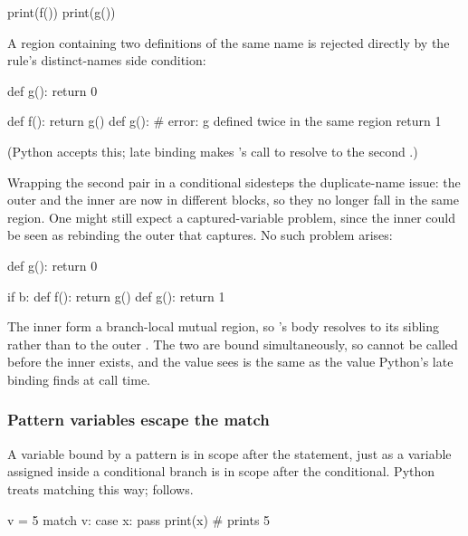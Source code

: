 \begin{PaperOnly}
\begin{python}
print(f())
print(g())
\end{python}

A region containing two definitions of the same name is rejected directly by the 
rule's distinct-names side condition:

\begin{python}
def g():
    return 0

def f():
    return g()
def g():     # error: g defined twice in the same region
    return 1
\end{python}

\noindent (Python accepts this; late binding makes 's call to  resolve to the
second .)

Wrapping the second  pair in a conditional sidesteps the duplicate-name issue:
the outer  and the inner  are now in different blocks, so they no longer
fall in the same region. One might still expect a captured-variable problem, since the inner
 could be seen as rebinding the outer  that  captures. No such
problem arises:

\begin{python}
def g():
    return 0

if b:
    def f():
        return g()
    def g():
        return 1
\end{python}

\noindent The inner  form a branch-local mutual region, so 's body
resolves  to its sibling rather than to the outer . The two are bound
simultaneously, so  cannot be called before the inner  exists, and the value
 sees is the same as the value Python's late binding finds at call time.

\subsubsection{Pattern variables escape the match}

A variable bound by a  pattern is in scope after the  statement, just as
a variable assigned inside a conditional branch is in scope after the conditional. Python treats matching
this way; \PurePy follows.

\begin{python}
v = 5
match v:
    case x:
        pass
print(x)    # prints 5
\end{python}


\end{PaperOnly}
